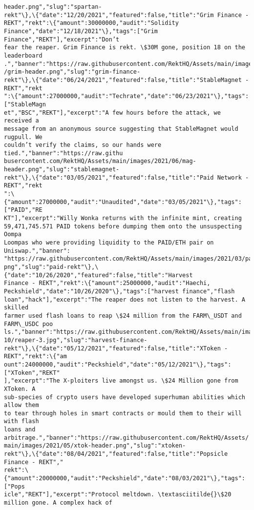 \documentclass[11pt]{article}
\begin{document}
\begin{Verbatim}[commandchars=\\\{\}]
header.png","slug":"spartan-
rekt"\},\{"date":"12/20/2021","featured":false,"title":"Grim Finance -
REKT","rekt":\{"amount":30000000,"audit":"Solidity
Finance","date":"12/18/2021"\},"tags":["Grim Finance","REKT"],"excerpt":"Don’t
fear the reaper. Grim Finance is rekt. \$30M gone, position 18 on the leaderboard
.","banner":"https://raw.githubusercontent.com/RektHQ/Assets/main/images/2021/12
/grim-header.png","slug":"grim-finance-
rekt"\},\{"date":"06/24/2021","featured":false,"title":"StableMagnet - REKT","rekt
":\{"amount":27000000,"audit":"Techrate","date":"06/23/2021"\},"tags":["StableMagn
et","BSC","REKT"],"excerpt":"A few hours before the attack, we received a
message from an anonymous source suggesting that StableMagnet would rugpull. We
couldn’t verify the claims, so our hands were tied.","banner":"https://raw.githu
busercontent.com/RektHQ/Assets/main/images/2021/06/mag-
header.png","slug":"stablemagnet-
rekt"\},\{"date":"03/05/2021","featured":false,"title":"Paid Network - REKT","rekt
":\{"amount":27000000,"audit":"Unaudited","date":"03/05/2021"\},"tags":["PAID","RE
KT"],"excerpt":"Willy Wonka returns with the infinite mint, creating
59,471,745.571 PAID tokens before dumping them onto the unsuspecting Oompa
Loompas who were providing liquidity to the PAID/ETH pair on Uniswap.","banner":
"https://raw.githubusercontent.com/RektHQ/Assets/main/images/2021/03/paidtokill.
png","slug":"paid-rekt"\},\{"date":"10/26/2020","featured":false,"title":"Harvest
Finance - REKT","rekt":\{"amount":25000000,"audit":"Haechi,
Peckshield","date":"10/26/2020"\},"tags":["harvest finance","flash
loan","hack"],"excerpt":"The reaper does not listen to the harvest. A skilled
farmer used flash loans to reap \$24 million from the FARM\_USDT and FARM\_USDC poo
ls.","banner":"https://raw.githubusercontent.com/RektHQ/Assets/main/images/2020/
10/reaper-3.jpg","slug":"harvest-finance-
rekt"\},\{"date":"05/12/2021","featured":false,"title":"XToken - REKT","rekt":\{"am
ount":24000000,"audit":"Peckshield","date":"05/12/2021"\},"tags":["XToken","REKT"
],"excerpt":"The X-ploiters live amongst us. \$24 Million gone from XToken. A
sub-species of crypto users have developed superhuman abilities which allow them
to tear through holes in smart contracts or mould them to their will with flash
loans and arbitrage.","banner":"https://raw.githubusercontent.com/RektHQ/Assets/
main/images/2021/05/xtok-header.png","slug":"xtoken-
rekt"\},\{"date":"08/04/2021","featured":false,"title":"Popsicle Finance - REKT","
rekt":\{"amount":20000000,"audit":"Peckshield","date":"08/03/2021"\},"tags":["Pops
icle","REKT"],"excerpt":"Protocol meltdown. \textasciitilde{}\$20 million gone. A complex hack of

\end{Verbatim}
\end{document}
